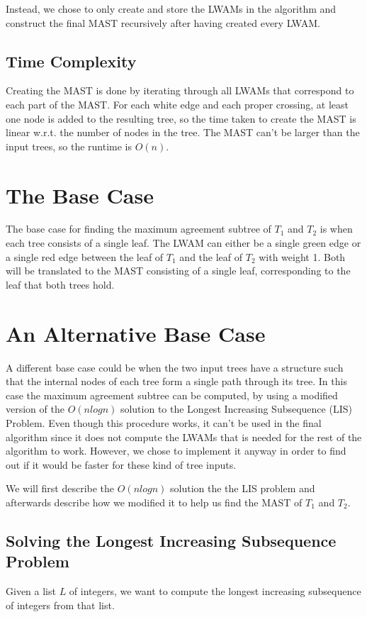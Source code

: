 Instead, we chose to only create and store the LWAMs in the algorithm and construct the final MAST recursively after having created every LWAM.

\subsection{Time Complexity}
Creating the MAST is done by iterating through all LWAMs that correspond to each part of the MAST. For each white edge and each proper crossing, at least one node is added to the resulting tree, so the time taken to create the MAST is linear w.r.t. the number of nodes in the tree. The MAST can't be larger than the input trees, so the runtime is $O(n)$.

\section{The Base Case}
The base case for finding the maximum agreement subtree of $T_1$ and $T_2$ is when each tree consists of a single leaf. The LWAM can either be a single green edge or a single red edge between the leaf of $T_1$ and the leaf of $T_2$ with weight 1. Both will be translated to the MAST consisting of a single leaf, corresponding to the leaf that both trees hold.

\section{An Alternative Base Case}
A different base case could be when the two input trees have a structure such that the internal nodes of each tree form a single path through its tree. In this case the maximum agreement subtree can be computed, by using a modified version of the $O(nlogn)$ solution to the Longest Increasing Subsequence (LIS) Problem. Even though this procedure works, it can't be used in the final algorithm since it does not compute the LWAMs that is needed for the rest of the algorithm to work. However, we chose to implement it anyway in order to find out if it would be faster for these kind of tree inputs.

We will first describe the $O(nlogn)$ solution the the LIS problem and afterwards describe how we modified it to help us find the MAST of $T_1$ and $T_2$.

\subsection{Solving the Longest Increasing Subsequence Problem}
Given a list $L$ of integers, we want to compute the longest increasing subsequence of integers from that list.

